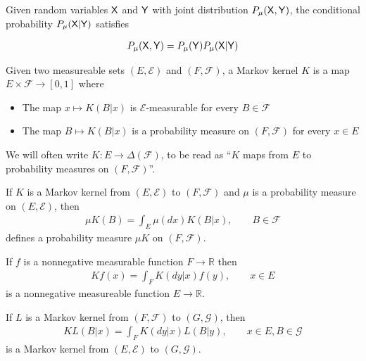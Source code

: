 \begin{definition}
Given random variables $\mathsf{X}$ and $\mathsf{Y}$ with joint distribution $P_\mu(\mathsf{X},\mathsf{Y})$, the conditional probability $P_\mu(\mathsf{X}|\mathsf{Y})$ satisfies

\begin{align*}
    P_\mu(\mathsf{X},\mathsf{Y}) = P_\mu(\mathsf{Y})P_\mu(\mathsf{X}|\mathsf{Y})
\end{align*}

\begin{definition}
Given two measureable sets $(E,\mathcal{E})$ and $(F,\mathcal{F})$, a Markov kernel $K$ is a map $E\times \mathcal{F} \to [0,1]$ where
\begin{itemize}
    \item The map $x\mapsto K(B|x)$ is $\mathcal{E}$-measurable for every $B\in\mathcal{F}$
    \item The map $B\mapsto K(B|x)$ is a probability measure on $(F,\mathcal{F})$ for every $x\in E$ 
\end{itemize}

We will often write $K:E\to \Delta(\mathcal{F})$, to be read as ``$K$ maps from $E$ to probability measures on $(F,\mathcal{F})$''.

\end{definition}

\begin{definition}\label{def:kernel_products}
If $K$ is a Markov kernel from $(E,\mathcal{E})$ to $(F,\mathcal{F})$ and $\mu$ is a probability measure on $(E,\mathcal{E})$, then
\begin{align}
    \mu K(B)=\int_E \mu(dx) K(B|x),\qquad B\in\mathcal{F}
\end{align}
defines a probability measure $\mu K$ on $(F,\mathcal{F})$.

If $f$ is a nonnegative measurable function $F\to \mathbb{R}$ then
\begin{align}
    Kf(x) = \int_F K(dy|x)f(y), \qquad x\in E
\end{align}
is a nonnegative measureable function $E\to \mathbb{R}$.

If $L$ is a Markov kernel from $(F,\mathcal{F})$ to $(G,\mathcal{G})$, then
\begin{align}
    KL(B|x) = \int_F K(dy|x) L(B|y),\qquad x\in E, B\in \mathcal{G}
\end{align}
is a Markov kernel from $(E,\mathcal{E})$ to $(G,\mathcal{G})$. \cite{cinlar_probability_2011}
\end{definition}

\end{definition}

